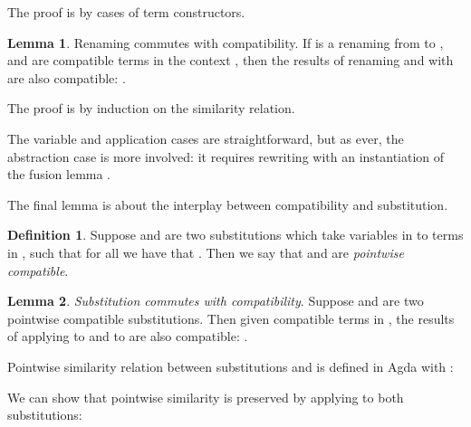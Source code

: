 \documentclass[bsc,frontabs,oneside,singlespacing,parskip,deptreport]{infthesis}
\theoremstyle{definition}
\newtheorem*{definition}{Definition}
\theoremstyle{lemma}
\newtheorem*{lemma}{Lemma}
\begin{document}
The proof is by cases of term constructors.


\begin{lemma}{Renaming commutes with compatibility.}
  If  is a renaming from  to , and  are
  compatible terms in the context , then the results of renaming
   and  with  are also compatible: .
\end{lemma}

The proof is by induction on the similarity relation.


The variable and application cases are straightforward, but as ever, the
abstraction case is more involved: it requires rewriting with an
instantiation of the fusion lemma .


The final lemma is about the interplay between compatibility and
substitution. 

\begin{definition}
  Suppose  and  are two substitutions which take
  variables  in  to terms in , such that for all
   we have that . Then we say
  that  and  are \textit{pointwise compatible}.
\end{definition}

\begin{lemma}
  \textit{Substitution commutes with compatibility}. Suppose 
  and  are two pointwise compatible substitutions. Then given
  compatible terms  in , the results of applying
   to  and  to  are also compatible:
  .
\end{lemma}

Pointwise similarity relation between substitutions  and 
is defined in Agda with :


We can show that pointwise similarity is preserved by
applying  to both substitutions:

\end{document}
